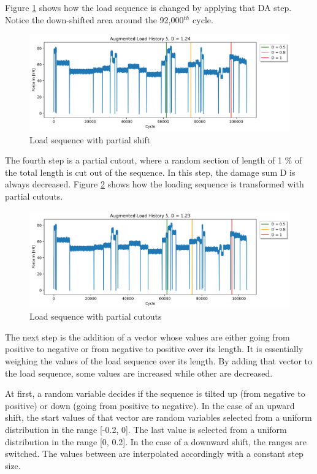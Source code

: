 Figure \ref{fig:Verlauf_5_shift_partial} shows how the load sequence is changed by applying that DA step. Notice the down-shifted area around the 92,000\(^{th}\) cycle.


\begin{figure}[H]
	\centering
	\includegraphics[width=1\linewidth]{IMGs/Verlauf_5_shift_partial.jpg}
	\caption{Load sequence with partial shift}
	\label{fig:Verlauf_5_shift_partial}
\end{figure}

The fourth step is a partial cutout, where a random section of length of 1 \% of the total length is cut out of the sequence. In this step, the damage sum D is always decreased. Figure \ref{fig:Verlauf_5_cutout} shows how the loading sequence is transformed with partial cutouts.

\begin{figure}[H]
	\centering
	\includegraphics[width=1\linewidth]{IMGs/Verlauf_5_coutout.jpg}
	\caption{Load sequence with partial cutouts}
	\label{fig:Verlauf_5_cutout}
\end{figure}

The next step is the addition of a vector whose values are either going from positive to negative or from negative to positive over its length. It is essentially weighing the values of the load sequence over its length. By adding that vector to the load sequence, some values are increased while other are decreased. 

At first, a random variable decides if the sequence is tilted up (from negative to positive) or down (going from positive to negative). In the case of an upward shift, the start values of that vector are random variables selected from a uniform distribution in the range [-0.2, 0]. The last value is selected from a uniform distribution in the range [0, 0.2]. In the case of a downward shift, the ranges are switched.
The values between are interpolated accordingly with a constant step size.


